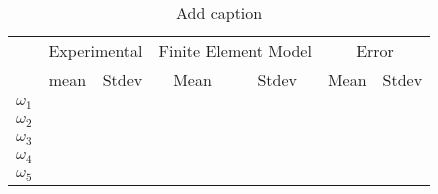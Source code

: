 \begin{table}[htbp]
  \centering
  \caption{Add caption}
    \begin{tabular}{rrrrrrr}
    \multicolumn{1}{c}{\multirow{2}[0]{*}{}} & \multicolumn{2}{c}{Experimental} & \multicolumn{2}{c}{Finite Element Model} & \multicolumn{2}{c}{Error} \\
    \multicolumn{1}{c}{} & \multicolumn{1}{c}{mean } & \multicolumn{1}{c}{Stdev} & \multicolumn{1}{c}{Mean} & \multicolumn{1}{c}{Stdev} & \multicolumn{1}{c}{Mean} & \multicolumn{1}{c}{Stdev} \\
    $\omega_1$ &       &       &       &       &       &  \\
    $\omega_2$ &       &       &       &       &       &  \\
    $\omega_3$ &       &       &       &       &       &  \\
    $\omega_4$ &       &       &       &       &       &  \\
    $\omega_5$ &       &       &       &       &       &  \\
    \end{tabular}%
  \label{tab:addlabel}%
\end{table}%
